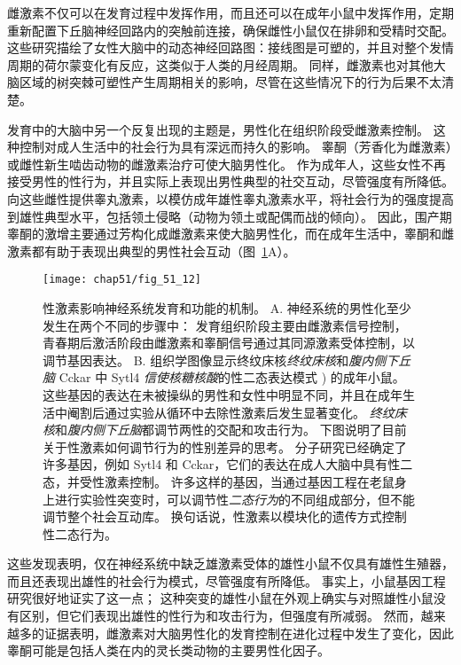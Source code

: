 雌激素不仅可以在发育过程中发挥作用，而且还可以在成年小鼠中发挥作用，定期重新配置下丘脑神经回路内的突触前连接，确保雌性小鼠仅在排卵和受精时交配。
这些研究描绘了女性大脑中的动态神经回路图：接线图是可塑的，并且对整个发情周期的荷尔蒙变化有反应，这类似于人类的月经周期。
同样，雌激素也对其他大脑区域的树突棘可塑性产生周期相关的影响，尽管在这些情况下的行为后果不太清楚。


发育中的大脑中另一个反复出现的主题是，男性化在组织阶段受雌激素控制。
这种控制对成人生活中的社会行为具有深远而持久的影响。
睾酮（芳香化为雌激素）或雌性新生啮齿动物的雌激素治疗可使大脑男性化。
作为成年人，这些女性不再接受男性的性行为，并且实际上表现出男性典型的社交互动，尽管强度有所降低。
向这些雌性提供睾丸激素，以模仿成年雄性睾丸激素水平，将社会行为的强度提高到雄性典型水平，包括领土侵略（动物为领土或配偶而战的倾向）。
因此，围产期睾酮的激增主要通过芳构化成雌激素来使大脑男性化，而在成年生活中，睾酮和雌激素都有助于表现出典型的男性社会互动（图~\ref{fig:51_12}A）。


\begin{figure}[htbp]
	\centering
	\texttt{[image: chap51/fig\_51\_12]}
	\caption{性激素影响神经系统发育和功能的机制。
		A. 神经系统的男性化至少发生在两个不同的步骤中：
		发育组织阶段主要由雌激素信号控制，青春期后激活阶段由雌激素和睾酮信号通过其同源激素受体控制，以调节基因表达。
		B. 组织学图像显示终纹床核\textit{终纹床核}和\textit{腹内侧下丘脑} Cckar 中 Sytl4 \textit{信使核糖核酸}的性二态表达模式 ) 的成年小鼠。
		这些基因的表达在未被操纵的男性和女性中明显不同，并且在成年生活中阉割后通过实验从循环中去除性激素后发生显著变化。
		\textit{终纹床核}和\textit{腹内侧下丘脑}都调节两性的交配和攻击行为。
		下图说明了目前关于性激素如何调节行为的性别差异的思考。
		分子研究已经确定了许多基因，例如 Sytl4 和 Cckar，它们的表达在成人大脑中具有性二态，并受性激素控制。
		许多这样的基因，当通过基因工程在老鼠身上进行实验性突变时，可以调节性\textit{二态行为}的不同组成部分，但不能调节整个社会互动库。
		换句话说，性激素以模块化的遗传方式控制性二态行为\cite{xu2012modular}。}
	\label{fig:51_12}
\end{figure}


这些发现表明，仅在神经系统中缺乏雄激素受体的雄性小鼠不仅具有雄性生殖器，而且还表现出雄性的社会行为模式，尽管强度有所降低。
事实上，小鼠基因工程研究很好地证实了这一点；
这种突变的雄性小鼠在外观上确实与对照雄性小鼠没有区别，但它们表现出雄性的性行为和攻击行为，但强度有所减弱。
然而，越来越多的证据表明，雌激素对大脑男性化的发育控制在进化过程中发生了变化，因此睾酮可能是包括人类在内的灵长类动物的主要男性化因子。



